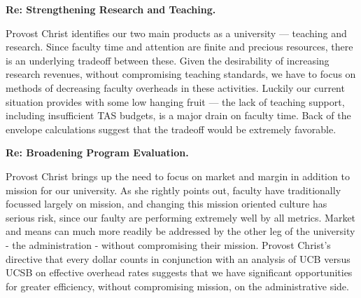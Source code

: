 \documentclass{article}
\begin{document}
{\bf Re: Strengthening Research and Teaching.}

Provost Christ identifies our two main products as a university ---
teaching and research. Since faculty time and attention are finite
and precious resources, there is an underlying tradeoff between
these.  Given the desirability of increasing research revenues,
without compromising teaching standards, we have to focus on methods
of decreasing faculty overheads in these activities. Luckily our
current situation provides with some low hanging fruit --- the lack
of teaching support, including insufficient TAS budgets, is a major
drain on faculty time. Back of the envelope calculations suggest
that the tradeoff would be extremely favorable.


{\bf Re: Broadening Program Evaluation.}

Provost Christ brings up the need to focus on market and margin 
in addition to mission for our university. As she rightly points
out, faculty have traditionally focussed largely on mission, and
changing this mission oriented culture has serious risk, since 
our faulty are performing extremely well by all metrics. Market 
and means can much more readily be addressed by the other leg of the
university - the administration - without compromising their mission. 
Provost Christ's directive that every dollar counts in conjunction
with an analysis of UCB versus UCSB on effective
overhead rates suggests that we have significant opportunities for 
greater efficiency, without compromising mission, on the administrative side.   
\end{document}
